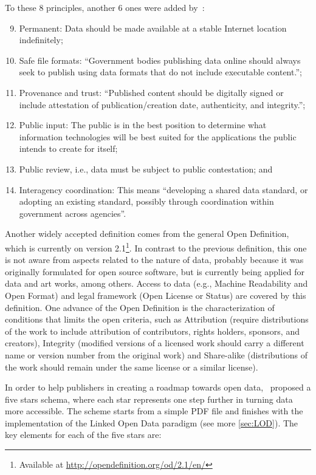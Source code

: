 To these 8 principles, another 6 ones were added by~:

\begin{enumerate} \setcounter{enumi}{8}
	\item Permanent: Data should be made available at a stable Internet location indefinitely;
	\item Safe file formats: “Government bodies publishing data online should always seek to publish using data formats that do not include executable content.”;
	\item Provenance and trust: “Published content should be digitally signed or include attestation of publication/creation date, authenticity, and integrity.”;
	\item Public input: The public is in the best position to determine what information technologies will be best suited for the applications the public intends to create for itself;
	\item Public review, i.e., data must be subject to public contestation; and
	\item Interagency coordination: This means ``developing a shared data standard, or adopting an existing standard, possibly through coordination within government across agencies''. 
\end{enumerate}

Another widely accepted definition comes from the general Open Definition, which is currently on version 2.1\footnote{Available at \url{http://opendefinition.org/od/2.1/en/}}.
In contrast to the previous definition, this one is not aware from aspects related to the nature of data, probably because it was originally formulated for open source software, but is currently being applied for data and art works, among others. 
Access to data (e.g., Machine Readability and Open Format) and legal framework (Open License or Status) are covered by this definition.
One advance of the Open Definition is the characterization of conditions that limits the open criteria, such as Attribution (require distributions of the work to include attribution of contributors, rights holders, sponsors, and creators), Integrity (modified versions of a licensed work should carry a different name or version number from the original work) and Share-alike (distributions of the work should remain under the same license or a similar license).

In order to help publishers in creating a roadmap towards open data,~ proposed a five stars schema, where each star represents one step further in turning data more accessible.
The scheme starts from a simple PDF file and finishes with the implementation of the Linked Open Data paradigm (see more \autoref{sec:LOD}).
The key elements for each of the five stars are:

